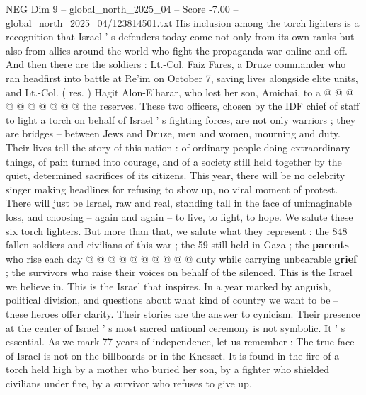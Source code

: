\begin{textsample}{NEG Dim 9 – global\_north\_2025\_04 – Score -7.00 – global\_north\_2025\_04/123814501.txt}
His inclusion among the torch lighters is a recognition that Israel ' s defenders today come not only from its own ranks but also from allies around the world who fight the propaganda war online and off.
And then there are the soldiers : Lt.-Col.
Faiz Fares, a Druze commander who ran headfirst into battle at Re'im on October 7, saving lives alongside elite units, and Lt.-Col. ( res. ) Hagit Alon-Elharar, who lost her son, Amichai, to a @ @ @ @ @ @ @ @ @ @ the reserves.
These two officers, chosen by the IDF chief of staff to light a torch on behalf of Israel ' s fighting forces, are not only warriors ; they are bridges -- between Jews and Druze, men and women, mourning and duty.
Their lives tell the story of this nation : of ordinary people doing extraordinary things, of pain turned into courage, and of a society still held together by the quiet, determined sacrifices of its citizens.
This year, there will be no celebrity singer making headlines for refusing to show up, no viral moment of protest.
There will just be Israel, raw and real, standing tall in the face of unimaginable loss, and choosing -- again and again -- to live, to fight, to hope.
We salute these six torch lighters.
But more than that, we salute what they represent : the 848 fallen soldiers and civilians of this war ; the 59 still held in Gaza ; the \textbf{parents} who rise each day @ @ @ @ @ @ @ @ @ @ duty while carrying unbearable \textbf{grief} ; the survivors who raise their voices on behalf of the silenced.
This is the Israel we believe in.
This is the Israel that inspires.
In a year marked by anguish, political division, and questions about what kind of country we want to be -- these heroes offer clarity.
Their stories are the answer to cynicism.
Their presence at the center of Israel ' s most sacred national ceremony is not symbolic.
It ' s essential.
As we mark 77 years of independence, let us remember : The true face of Israel is not on the billboards or in the Knesset.
It is found in the fire of a torch held high by a mother who buried her son, by a fighter who shielded civilians under fire, by a survivor who refuses to give up.

\end{textsample}
